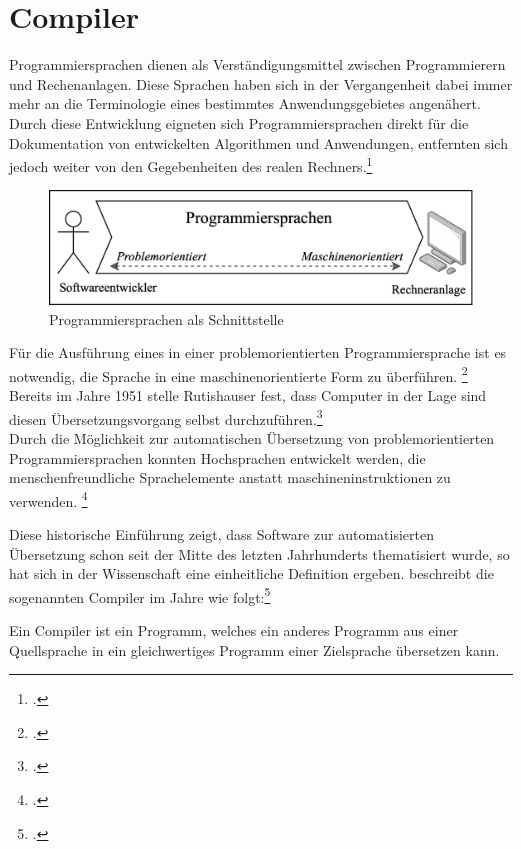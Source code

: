 \chapter{Compiler}


Programmiersprachen dienen als Verständigungsmittel zwischen Programmierern und Rechenanlagen. Diese Sprachen haben sich in der Vergangenheit dabei immer mehr an die  Terminologie eines bestimmtes Anwendungsgebietes angenähert. Durch diese Entwicklung eigneten sich Programmiersprachen direkt für die Dokumentation von entwickelten Algorithmen und Anwendungen, entfernten sich jedoch weiter von den Gegebenheiten des realen Rechners.\footcite[Vgl.][S. 15]{Schneider1975}
\begin{figure}[h]
 \includegraphics[width=\textwidth,height=\textheight,keepaspectratio]{Images/LanguageIntermediary.png}
 \caption{Programmiersprachen als Schnittstelle}
 \label{fig:Programmiersprachen als Schnittstelle}
\end{figure}
Für die Ausführung eines in einer problemorientierten Programmiersprache ist es notwendig, die Sprache in eine maschinenorientierte Form zu überführen. \footcite[Vgl.][S. 15]{Schneider1975} Bereits im Jahre 1951 stelle Rutishauser fest, dass Computer in der Lage sind diesen Übersetzungsvorgang selbst durchzuführen.\footcite[Vgl.][S. 1]{Quelle fehlt! improve https://link.springer.com/article/10.1007/BF02009622}  %
\\
Durch die Möglichkeit zur automatischen Übersetzung von problemorientierten Programmiersprachen konnten Hochsprachen entwickelt werden, die menschenfreundliche Sprachelemente anstatt maschineninstruktionen zu verwenden. \footcite[Vgl.][S. 47]{Wagenknecht2014}

Diese historische Einführung zeigt, dass Software zur automatisierten Übersetzung schon seit der Mitte des letzten Jahrhunderts thematisiert wurde, so hat sich in der Wissenschaft eine einheitliche Definition ergeben.  \citeauthor{Ullmann2008} beschreibt die sogenannten Compiler im Jahre \citeyear{Ullmann2008} wie folgt:\footcite[Vgl.][S. 1]{Ullmann2008} 
\begin{Def}[Compiler]
Ein Compiler ist ein Programm, welches ein anderes Programm aus einer Quellsprache in ein gleichwertiges Programm einer Zielsprache übersetzen kann.
\end{Def}


